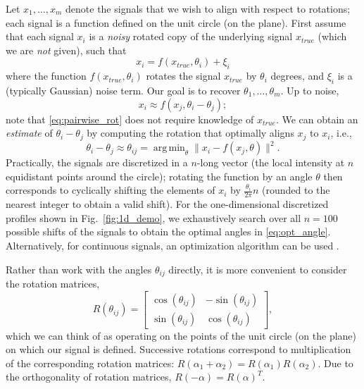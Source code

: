 \documentclass[10pt,twocolumn]{article}
\DeclareMathOperator*{\argmin}{arg\,min}
\newcommand{\fig}[0]{Fig.}
\begin{document}
Let $ x_1, \dots, x_m$ denote the signals that we wish to align with respect to rotations;
each signal is a function defined on the unit circle (on the plane).
%
%
First assume that each signal $x_i$ is a {\it noisy} rotated copy of the underlying signal $x_{true}$
(which we are {\it not} given), such that
\begin{equation}
x_i = f(x_{true}, \theta_i) + \xi_i
\end{equation}
where the function $f(x_{true}, \theta_i)$ rotates the signal $x_{true}$ by $\theta_i$ degrees, and $\xi_i$ is a (typically Gaussian) noise term.
%
Our goal is to recover $\theta_1, \dots, \theta_m$.
%
Up to noise,
\begin{equation} \label{eq:pairwise_rot}
x_i \approx f(x_j, \theta_i - \theta_j) ;
\end{equation}
note that \eqref{eq:pairwise_rot} does not require knowledge of $x_{true}$.
%
We can obtain an {\it estimate} of $\theta_i - \theta_j$ by computing the rotation that optimally aligns $x_j$ to $x_i$,
i.e., %
%
\begin{equation} \label{eq:opt_angle}
\theta_i - \theta_j \approx \theta_{ij} = \argmin_{\theta} \|x_i - f(x_j, \theta)\|^2.
\end{equation}
%
Practically, the signals are discretized in a $n$-long vector (the local intensity at $n$ equidistant points around the circle);
rotating the function by an angle $\theta$ then corresponds to cyclically shifting the elements of $x_i$
by $\frac{\theta_i}{2 \pi} n$ (rounded to the nearest integer to obtain a valid shift).
%
For the one-dimensional discretized profiles shown in \fig~\ref{fig:1d_demo}, we exhaustively search over all $n=100$ possible shifts of the signals to obtain the optimal angles in \eqref{eq:opt_angle}.
%
Alternatively, for continuous signals, an optimization algorithm
can be used \citep{ahuja2007template}.

Rather than work with the angles $\theta_{ij}$ directly, it is more convenient to consider the rotation matrices,
\begin{equation} \label{eq:R_theta}
R(\theta_{ij}) = \begin{bmatrix}
\cos(\theta_{ij}) & -\sin(\theta_{ij}) \\
\sin(\theta_{ij}) & \cos(\theta_{ij})
\end{bmatrix},
\end{equation}
which we can think of as operating on the points of the unit circle (on the plane) on which our signal is defined.
%
Successive rotations correspond to multiplication of the corresponding rotation matrices: $R(\alpha_1 + \alpha_2) = R(\alpha_1) R(\alpha_2)$.
%
Due to the orthogonality of rotation matrices, $R(-\alpha) = R(\alpha)^T$.
\end{document}
